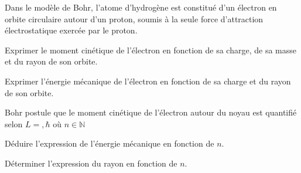 

Dans le modèle de Bohr, l'atome d'hydrogène est constitué d'un électron en orbite circulaire autour d'un proton, soumis à la seule force d'attraction électrostatique exercée par le proton.

\question Exprimer le moment cinétique de l'électron en fonction de sa charge, de sa masse et du rayon de son orbite.

\question Exprimer l'énergie mécanique de l'électron en fonction de sa charge et du rayon de son orbite.

Bohr postule que le moment cinétique de l'électron autour du noyau est quantifié selon $L=,\hbar$ où $n\in \mathbb{N}$

\question Déduire l'expression de l'énergie mécanique en fonction de $n$.

\question Déterminer l'expression du rayon en fonction de $n$.

